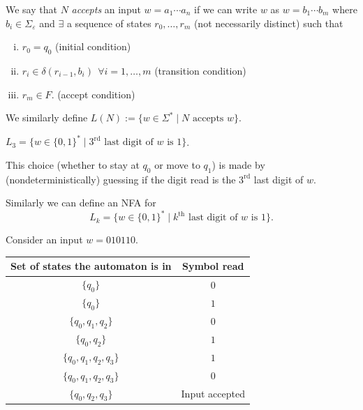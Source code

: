 \begin{greybox}
\begin{definition}
We say that $N$ \emph{accepts} an input $w = a_1 \cdots a_n$ if we can write $w$ as $w = b_1 \cdots b_m$ where $b_i \in \Sigma_\varepsilon$ and $\exists$ a sequence of states $r_0, \dots, r_m$ (not necessarily distinct) such that
\begin{enumerate}[i)]
    \item $r_0 = q_0$ \hfill (initial condition)
    \item $r_i \in \delta(r_{i-1}, b_i) \ \ \forall i = 1, \dots, m$ \hfill (transition condition)
    \item $r_m \in F$. \hfill (accept condition)
\end{enumerate}
\end{definition}
\end{greybox}

We similarly define $L(N) := \{ w \in \Sigma^* \mid N \text{ accepts } w \}$.

\begin{example}
$L_3 = \{ w \in \{0,1\}^* \mid 3^{\text{rd}} \text{ last digit of } w \text{ is } 1 \}$.

\begin{center}
\end{center}

This choice (whether to stay at $q_0$ or move to $q_1$) is made by (nondeterministically) guessing if the digit read is the $3^{\text{rd}}$ last digit of $w$.

\bigskip
Similarly we can define an NFA for
\[
L_k = \{ w \in \{0,1\}^* \mid k^{\text{th}} \text{ last digit of } w \text{ is } 1 \}.
\]
\end{example}

\bigskip
\noindent Consider an input $w = 010110$.

\begin{center}
\begin{tabular}{c|c}
Set of states the automaton is in & Symbol read \\ \hline
$\{q_0\}$ & $0$ \\
$\{q_0\}$ & $1$ \\
$\{q_0, q_1, q_2\}$ & $0$ \\
$\{q_0, q_2\}$ & $1$ \\
$\{q_0, q_1, q_2, q_3\}$ & $1$ \\
$\{q_0, q_1, q_2, q_3\}$ & $0$ \\
$\{q_0, q_2, q_3\}$ & Input accepted
\end{tabular}
\end{center}

